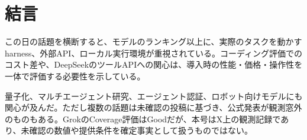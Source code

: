 \section{結言}
この日の話題を横断すると、モデルのランキング以上に、実際のタスクを動かすharness、外部API、ローカル実行環境が重視されている。コーディング評価でのコスト差や、DeepSeekのツールAPIへの関心は、導入時の性能・価格・操作性を一体で評価する必要性を示している。

量子化、マルチエージェント研究、エージェント認証、ロボット向けモデルにも関心が及んだ。ただし複数の話題は未確認の投稿に基づき、公式発表が観測窓外のものもある。GrokのCoverage評価はGoodだが、本号はX上の観測記録であり、未確認の数値や提供条件を確定事実として扱うものではない。